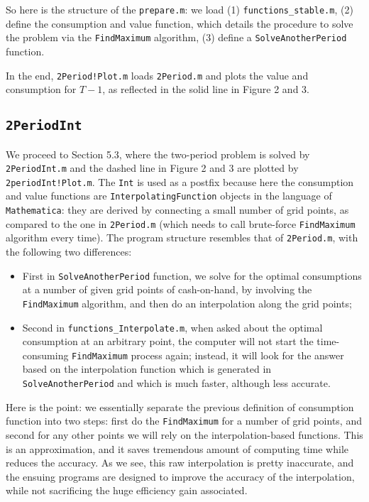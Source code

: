 \documentclass[titlepage,abstract]{\econtex}
\begin{document}
So here is the structure of the \texttt{prepare.m}: we load (1) \texttt{functions\_stable.m}, (2) define the consumption and value function, which details the procedure to solve the problem via the \texttt{FindMaximum} algorithm, (3) define a \texttt{SolveAnotherPeriod} function.

In the end, \texttt{2Period!Plot.m} loads \texttt{2Period.m} and plots the value and consumption for $T-1$, as reflected in the solid line in Figure 2 and 3.

\subsection{\texttt{2PeriodInt}}
We proceed to Section 5.3, where the two-period problem is solved by \texttt{2PeriodInt.m} and the dashed line in Figure 2 and 3 are plotted by \texttt{2periodInt!Plot.m}. The \texttt{Int} is used as a postfix because here the consumption and value functions are \texttt{InterpolatingFunction} objects in the language of \texttt{Mathematica}: they are derived by connecting a small number of grid points, as compared to the one in \texttt{2Period.m} (which needs to call brute-force \texttt{FindMaximum} algorithm every time). The program structure resembles that of \texttt{2Period.m}, with the following two differences:
\begin{itemize}
      \item First in \texttt{SolveAnotherPeriod} function, we solve for the optimal consumptions at a number of given grid points of cash-on-hand, by involving the \texttt{FindMaximum} algorithm, and then do an interpolation along the grid points;
      \item Second in \texttt{functions\_Interpolate.m}, when asked about the optimal consumption at an arbitrary point, the computer will not start the time-consuming \texttt{FindMaximum} process again; instead, it will look for the answer based on the interpolation function which is generated in \texttt{SolveAnotherPeriod} and which is much faster, although less accurate.
\end{itemize}

Here is the point: we essentially separate the previous definition of consumption function into two steps: first do the \texttt{FindMaximum} for a number of grid points, and second for any other points we will rely on the interpolation-based functions. This is an approximation, and it saves tremendous amount of computing time while reduces the accuracy. As we see, this raw interpolation is pretty inaccurate, and the ensuing programs are designed to improve the accuracy of the interpolation, while not sacrificing the huge efficiency gain associated.
\end{document}
